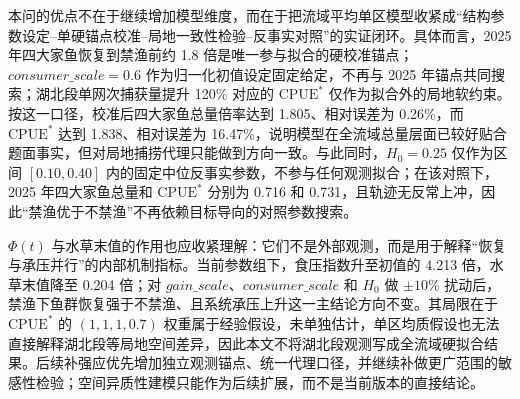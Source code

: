 本问的优点不在于继续增加模型维度，而在于把流域平均单区模型收紧成“结构参数设定--单硬锚点校准--局地一致性检验--反事实对照”的实证闭环。具体而言，2025 年四大家鱼恢复到禁渔前约 1.8 倍是唯一参与拟合的硬校准锚点；\(consumer\_scale=0.6\) 作为归一化初值设定固定给定，不再与 2025 年锚点共同搜索；湖北段单网次捕获量提升 120\% 对应的 \(\mathrm{CPUE}^*\) 仅作为拟合外的局地软约束。按这一口径，校准后四大家鱼总量倍率达到 1.805、相对误差为 0.26\%，而 \(\mathrm{CPUE}^*\) 达到 1.838、相对误差为 16.47\%，说明模型在全流域总量层面已较好贴合题面事实，但对局地捕捞代理只能做到方向一致。与此同时，\(H_0=0.25\) 仅作为区间 \([0.10,0.40]\) 内的固定中位反事实参数，不参与任何观测拟合；在该对照下，2025 年四大家鱼总量和 \(\mathrm{CPUE}^*\) 分别为 0.716 和 0.731，且轨迹无反常上冲，因此“禁渔优于不禁渔”不再依赖目标导向的对照参数搜索。

\(\Phi(t)\) 与水草末值的作用也应收紧理解：它们不是外部观测，而是用于解释“恢复与承压并行”的内部机制指标。当前参数组下，食压指数升至初值的 4.213 倍，水草末值降至 0.204 倍；对 \(gain\_scale\)、\(consumer\_scale\) 和 \(H_0\) 做 \(\pm10\%\) 扰动后，禁渔下鱼群恢复强于不禁渔、且系统承压上升这一主结论方向不变。其局限在于 \(\mathrm{CPUE}^*\) 的 \((1,1,1,0.7)\) 权重属于经验假设，未单独估计，单区均质假设也无法直接解释湖北段等局地空间差异，因此本文不将湖北段观测写成全流域硬拟合结果。后续补强应优先增加独立观测锚点、统一代理口径，并继续补做更广范围的敏感性检验；空间异质性建模只能作为后续扩展，而不是当前版本的直接结论。
